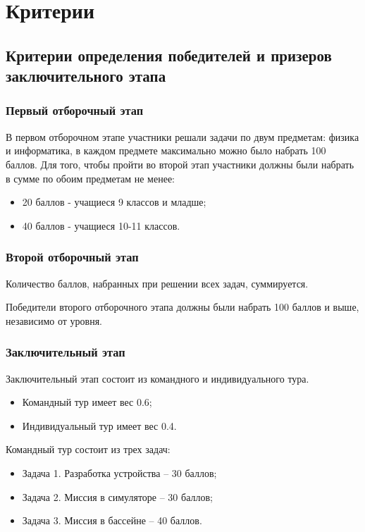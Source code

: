\part{Критерии}

\chapter{Критерии определения победителей и призеров заключительного этапа}

\section{Первый отборочный этап}

В первом отборочном этапе участники решали задачи по двум предметам: физика и информатика, в каждом предмете максимально можно было набрать 100 баллов. Для того, чтобы пройти во второй этап участники  должны были набрать в сумме по обоим предметам не менее:
\begin{itemize}
    \item 20 баллов - учащиеся 9 классов и младше;
    \item 40 баллов - учащиеся 10-11 классов.
\end{itemize}

\section{Второй отборочный этап}

Количество баллов, набранных при решении всех задач, суммируется. 

Победители второго отборочного этапа должны были набрать 100 баллов и выше, независимо от уровня.

\section{Заключительный этап}

Заключительный этап состоит из командного и индивидуального тура.
\begin{itemize}
    \item Командный тур имеет вес 0.6;
    \item Индивидуальный тур имеет вес 0.4.
\end{itemize}
 
Командный тур состоит из трех задач:
\begin{itemize}
    \item Задача 1. Разработка устройства – 30 баллов;
    \item Задача 2. Миссия в симуляторе – 30 баллов;
    \item Задача 3. Миссия в бассейне – 40 баллов.
\end{itemize}


